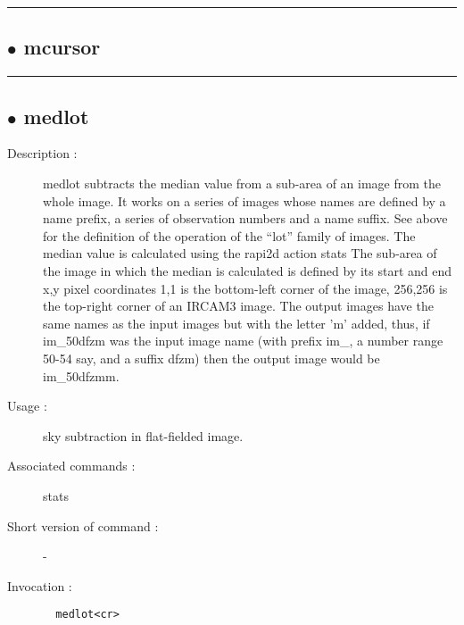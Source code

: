 \hrule \subsection*{$\bullet$ mcursor}

\hrule \subsection*{$\bullet$ medlot}
\begin{description}
\item[Description :] medlot subtracts the median value from a sub-area of an image
from the whole image.  It works on a series of images whose names are
defined by a name prefix, a series of observation numbers and a name
suffix. See above for the definition of the operation of the ``lot'' family
of images.  The median value is calculated using the rapi2d action stats
The sub-area of the image in which the median is calculated is defined by
its start and end x,y pixel coordinates 1,1 is the bottom-left corner of
the image, 256,256 is the top-right corner of an {\sc IRCAM3} image.  The
output images have the same names as the input images but with the letter
'm' added, thus, if im\_50dfzm was the input image name (with prefix im\_, a
number range 50-54 say, and a suffix dfzm) then the output image would be
im\_50dfzmm.
\item[Usage :] sky subtraction in flat-fielded image.
\item[Associated commands :] stats
\item[Short version of command :] -
\item[Invocation :]

\verb+  medlot<cr> +\end{description}

